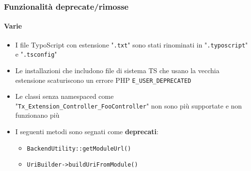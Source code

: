 
\begin{frame}[fragile]
	\frametitle{Funzionalità deprecate/rimosse}
	\framesubtitle{Varie}

	\begin{itemize}
		\item I file TypoScript con estensione "\texttt{.txt}" sono stati rinominati
			in "\texttt{.typoscript}" e "\texttt{.tsconfig}"
		\item Le installazioni che includono file di sistema TS che usano la vecchia estensione
			scaturiscono un errore PHP \texttt{E\_USER\_DEPRECATED}
		\item Le classi senza namespaced come 
			"\texttt{Tx\_Extension\_Controller\_FooController}"\newline
			non sono più supportate e non funzionano più
		\item I seguenti metodi sono segnati come \textbf{deprecati}:

			\begin{itemize}
				\item \texttt{BackendUtility::getModuleUrl()}
				\item \texttt{UriBuilder->buildUriFromModule()}
			\end{itemize}

	\end{itemize}

\end{frame}


